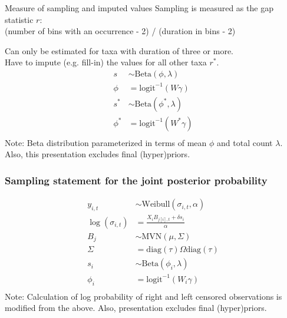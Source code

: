 \documentclass{beamer}
\begin{document}
\begin{frame}
  \begin{block}{Measure of sampling and imputed values}
    Sampling is measured as the gap statistic \(r\): \\(number of bins with an occurrence - 2) / (duration in bins - 2)

    Can only be estimated for taxa with duration of three or more. \\Have to impute (e.g. fill-in) the values for all other taxa \(r^{\ast}\).
    \begin{align*}
      s &\sim \text{Beta}(\phi, \lambda) \\
      \phi &= \text{logit}^{-1}(W\gamma) \\
      s^{\ast} &\sim \text{Beta}(\phi^{\ast}, \lambda) \\
      \phi^{\ast} &= \text{logit}^{-1}(W^{\ast}\gamma) \\
    \end{align*}
    \scriptsize{Note: Beta distribution parameterized in terms of mean \(\phi\) and total count \(\lambda\). \\Also, this presentation excludes final (hyper)priors.}
  \end{block}

\end{frame}

\begin{frame}
  \frametitle{Sampling statement for the joint posterior probability}

  \small{
    \begin{align*}
      y_{i, t} &\sim \text{Weibull}(\sigma_{i, t}, \alpha) \\
      \log(\sigma_{i, t}) &= \frac{X_{i}B_{j[i], t} + \delta s_{i}}{\alpha} \\
      B_{j} &\sim \text{MVN}(\mu, \Sigma) \\
      \Sigma &= \text{diag}(\tau) \Omega \text{diag}(\tau) \\
      s_{i} &\sim \text{Beta}(\phi_{i}, \lambda) \\
      \phi_{i} &= \text{logit}^{-1}(W_{i}\gamma) \\
    \end{align*}
  }
    \scriptsize{Note: Calculation of log probability of right and left censored observations is modified from the above. Also, presentation excludes final (hyper)priors.}
\end{frame}
\end{document}
